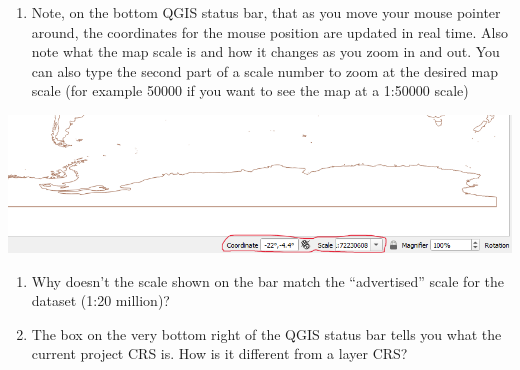 \documentclass[
  letterpaper,
  DIV=11,
  numbers=noendperiod]{scrreprt}
\providecommand{\tightlist}{%
  \setlength{\itemsep}{0pt}\setlength{\parskip}{0pt}}\usepackage{longtable,booktabs,array}
\begin{document}
\begin{enumerate}
\def\labelenumi{(\arabic{enumi})}
\setcounter{enumi}{50}
\tightlist
\item
  Note, on the bottom QGIS status bar, that as you move your mouse
  pointer around, the coordinates for the mouse position are updated in
  real time. Also note what the map scale is and how it changes as you
  zoom in and out. You can also type the second part of a scale number
  to zoom at the desired map scale (for example 50000 if you want to see
  the map at a 1:50000 scale)
\end{enumerate}

\includegraphics{images/lab_2/lab_2_img4_status_bar.png}

\begin{tcolorbox}[enhanced jigsaw, coltitle=black, toprule=.15mm, breakable, opacitybacktitle=0.6, left=2mm, colback=white, leftrule=.75mm, rightrule=.15mm, colbacktitle=quarto-callout-important-color!10!white, toptitle=1mm, titlerule=0mm, colframe=quarto-callout-important-color-frame, arc=.35mm, bottomtitle=1mm, opacityback=0, bottomrule=.15mm, title=\textcolor{quarto-callout-important-color}{\faExclamation}\hspace{0.5em}{Stop and Think}]

\begin{enumerate}
\def\labelenumi{\alph{enumi})}
\item
  Why doesn't the scale shown on the bar match the ``advertised'' scale
  for the dataset (1:20 million)?
\item
  The box on the very bottom right of the QGIS status bar tells you what
  the current project CRS is. How is it different from a layer CRS?
\end{enumerate}

\end{tcolorbox}
\end{document}
